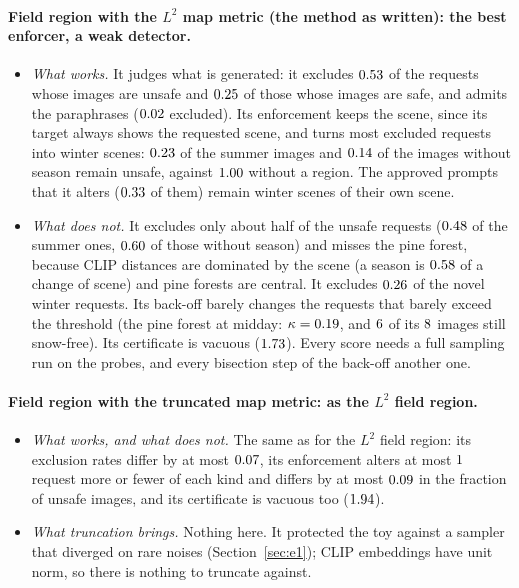 \documentclass{article}
\theoremstyle{plain}
\theoremstyle{remark}
\begin{document}
\paragraph{Field region with the $L^2$ map metric (the method as written): the best enforcer, a weak detector.}
\begin{itemize}
\item \emph{What works.} It judges what is generated: it excludes $0.53$ of the requests whose images are unsafe and
$0.25$ of those whose images are safe, and admits the paraphrases ($0.02$ excluded). Its enforcement keeps the scene,
since its target always shows the requested scene, and turns most excluded requests into winter scenes: $0.23$ of the
summer images and $0.14$ of the images without season remain unsafe, against $1.00$ without a region. The
approved prompts that it alters ($0.33$ of them) remain winter scenes of their own scene.
\item \emph{What does not.} It excludes only about half of the unsafe requests ($0.48$ of the summer ones, $0.60$ of
those without season) and misses the pine forest, because CLIP distances are dominated by the scene (a season is $0.58$ of a
change of scene) and pine forests are central. It excludes $0.26$ of the novel winter requests. Its back-off barely changes
the requests that barely exceed the threshold (the pine forest at midday: $\kappa=0.19$, and $6$ of its
$8$ images still snow-free). Its certificate is vacuous ($1.73$). Every score needs a full sampling run on the probes,
and every bisection step of the back-off another one.
\end{itemize}

\paragraph{Field region with the truncated map metric: as the $L^2$ field region.}
\begin{itemize}
\item \emph{What works, and what does not.} The same as for the $L^2$ field region: its exclusion rates differ by at most
$0.07$, its enforcement alters at most $1$ request more or fewer of each kind and differs by at most
$0.09$ in the fraction of unsafe images, and its certificate is vacuous too ($1.94$).
\item \emph{What truncation brings.} Nothing here. It protected the toy against a sampler that diverged on rare noises
(Section~\ref{sec:e1}); CLIP embeddings have unit norm, so there is nothing to truncate against.
\end{itemize}
\end{document}
